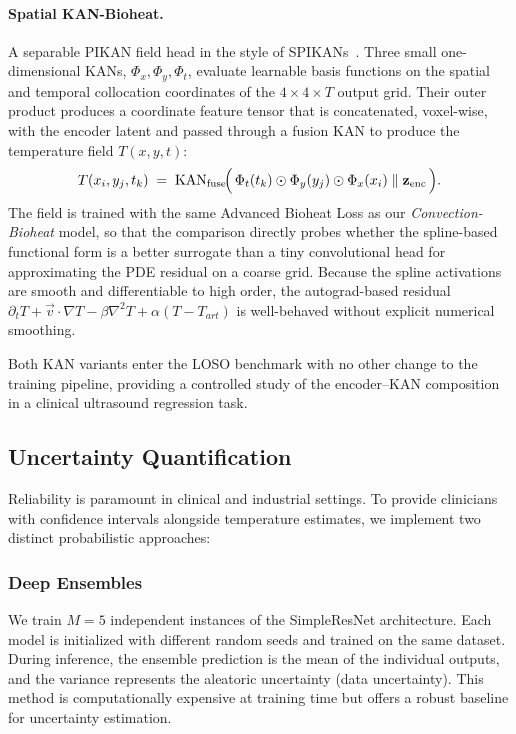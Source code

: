 \paragraph{Spatial KAN-Bioheat.} A separable PIKAN field head in the style of SPIKANs~\cite{jacob2025spikan}. Three small one-dimensional KANs, $\Phi_x,\Phi_y,\Phi_t$, evaluate learnable basis functions on the spatial and temporal collocation coordinates of the $4\times4\times T$ output grid. Their outer product produces a coordinate feature tensor that is concatenated, voxel-wise, with the encoder latent and passed through a fusion KAN to produce the temperature field $T(x,y,t)$:
\begin{equation}
    T(x_i, y_j, t_k) \;=\; \mathrm{KAN}_{\text{fuse}}\!\Bigl(\, \Phi_t(t_k)\odot\Phi_y(y_j)\odot\Phi_x(x_i)\;\Vert\;\mathbf{z}_{\text{enc}} \,\Bigr).
\end{equation}
The field is trained with the same Advanced Bioheat Loss as our \emph{Convection-Bioheat} model, so that the comparison directly probes whether the spline-based functional form is a better surrogate than a tiny convolutional head for approximating the PDE residual on a coarse grid. Because the spline activations are smooth and differentiable to high order, the autograd-based residual $\partial_t T + \vec{v}\!\cdot\!\nabla T - \beta\nabla^2 T + \alpha(T-T_{art})$ is well-behaved without explicit numerical smoothing.

Both KAN variants enter the LOSO benchmark with no other change to the training pipeline, providing a controlled study of the encoder--KAN composition in a clinical ultrasound regression task.



\subsection{Uncertainty Quantification}
Reliability is paramount in clinical and industrial settings. To provide clinicians with confidence intervals alongside temperature estimates, we implement two distinct probabilistic approaches:

\subsubsection{Deep Ensembles}
We train $M=5$ independent instances of the SimpleResNet architecture. Each model is initialized with different random seeds and trained on the same dataset. During inference, the ensemble prediction is the mean of the individual outputs, and the variance represents the aleatoric uncertainty (data uncertainty). This method is computationally expensive at training time but offers a robust baseline for uncertainty estimation.

